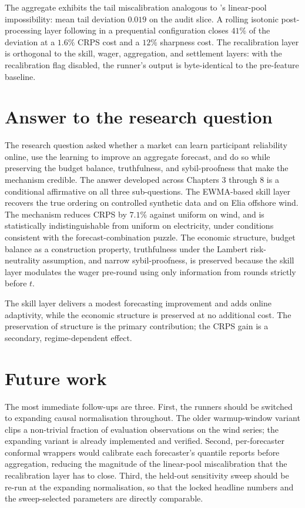 \documentclass[
  11pt,
  a4paper,
  oneside]{report}
\begin{document}
The aggregate exhibits the tail miscalibration analogous to
\citet{ranjan2010combining}'s linear-pool impossibility: mean tail
deviation \(0.019\) on the audit slice. A rolling isotonic
post-processing layer following \citet{kuleshov2018accurate} in a
prequential configuration \citep{dawid1984prequential} closes \(41\%\)
of the deviation at a \(1.6\%\) CRPS cost and a \(12\%\) sharpness cost.
The recalibration layer is orthogonal to the skill, wager, aggregation,
and settlement layers: with the recalibration flag disabled, the
runner's output is byte-identical to the pre-feature baseline.

\section{Answer to the research
question}\label{answer-to-the-research-question}

The research question asked whether a market can learn participant
reliability online, use the learning to improve an aggregate forecast,
and do so while preserving the budget balance, truthfulness, and
sybil-proofness that make the mechanism credible. The answer developed
across Chapters 3 through 8 is a conditional affirmative on all three
sub-questions. The EWMA-based skill layer recovers the true ordering on
controlled synthetic data and on Elia offshore wind. The mechanism
reduces CRPS by \(7.1\%\) against uniform on wind, and is statistically
indistinguishable from uniform on electricity, under conditions
consistent with the forecast-combination puzzle. The economic structure,
budget balance as a construction property, truthfulness under the
Lambert risk-neutrality assumption, and narrow sybil-proofness, is
preserved because the skill layer modulates the wager pre-round using
only information from rounds strictly before \(t\).

The skill layer delivers a modest forecasting improvement and adds
online adaptivity, while the economic structure is preserved at no
additional cost. The preservation of structure is the primary
contribution; the CRPS gain is a secondary, regime-dependent effect.

\section{Future work}\label{future-work}

The most immediate follow-ups are three. First, the runners should be
switched to expanding causal normalisation throughout. The older
warmup-window variant clips a non-trivial fraction of evaluation
observations on the wind series; the expanding variant is already
implemented and verified. Second, per-forecaster conformal wrappers
would calibrate each forecaster's quantile reports before aggregation,
reducing the magnitude of the linear-pool miscalibration that the
recalibration layer has to close. Third, the held-out sensitivity sweep
should be re-run at the expanding normalisation, so that the locked
headline numbers and the sweep-selected parameters are directly
comparable.
\end{document}
